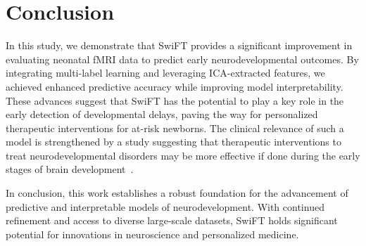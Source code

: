 \documentclass[runningheads,a4paper]{llncs}
\begin{document}
\section{Conclusion}
\label{sec:conclusion}
%
In this study, we demonstrate that SwiFT provides a significant improvement in evaluating neonatal fMRI data to predict early neurodevelopmental outcomes. By integrating multi-label learning and leveraging ICA-extracted features, we achieved enhanced predictive accuracy while improving model interpretability. These advances suggest that SwiFT has the potential to play a key role in the early detection of developmental delays, paving the way for personalized therapeutic interventions for at-risk newborns. The clinical relevance of such a model is strengthened by a study suggesting that therapeutic interventions to treat neurodevelopmental disorders may be more effective if done during the early stages of brain development~\cite{SVALINA2022}.
%

In conclusion, this work establishes a robust foundation for the advancement of predictive and interpretable models of neurodevelopment. With continued refinement and access to diverse large-scale datasets, SwiFT holds significant potential for innovations in neuroscience and personalized medicine.

\end{document}
